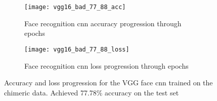 \begin{figure}[H]
	\centering
	\begin{subfigure}{0.48\textwidth}
		\centering
		\texttt{[image: vgg16\_bad\_77\_88\_acc]}
		\caption{Face recognition \gls{cnn} accuracy progression through epochs}
		\label{fig:vgg_77_acc}
	\end{subfigure}
	\begin{subfigure}{0.48\textwidth}
		\centering
		\texttt{[image: vgg16\_bad\_77\_88\_loss]}
		\caption{Face recognition \gls{cnn} loss progression through epochs}
		\label{fig:vgg_77_loss}
	\end{subfigure}
	\caption{Accuracy and loss progression for the VGG face \gls{cnn} trained on the chimeric data. Achieved 77.78\% accuracy on the test set }
	\label{fig:vgg_77_graphs}
\end{figure}

